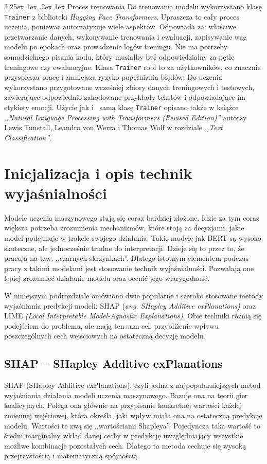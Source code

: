 \documentclass[wmii, inf, mgr]{uwmthesis}
\makeatletter
\renewcommand\paragraph{\@startsection{paragraph}{4}{\z@}%
  {3.25ex \@plus1ex \@minus.2ex}%
  {1ex}%
  {\normalfont\normalsize\bfseries}}
\makeatother
\begin{document}
\paragraph{Proces trenowania}
Do trenowania modelu wykorzystano klasę \texttt{Trainer} z biblioteki \textit{Hugging Face Transformers}. Upraszcza to cały proces uczenia, ponieważ automatyzuje wiele aspektów. Odpowiada za: właściwe przetwarzanie danych, wykonywanie trenowania i ewaluacji, zapisywanie wag modelu po epokach oraz prowadzenie logów treningu. Nie ma potrzeby samodzielnego pisania kodu, który musiałby być odpowiedzialny za pętle treningowe czy ewaluacyjne. Klasa \texttt{Trainer} robi to za użytkowników, co znacznie przyspiesza pracę i zmniejsza ryzyko popełniania błędów. Do uczenia wykorzystano przygotowane wcześniej zbiory danych treningowych i testowych, zawierające odpowiednio zakodowane przykłady tekstów i odpowiadające im etykiety emocji. Użycie jak i~ samą klasę \texttt{Trainer} opisano także w książce \textit{,,Natural Language Processing with Transformers (Revised Edition)''} \cite{NaturalLanguageProcessing} autorzy Lewis Tunstall, Leandro von Werra i Thomas Wolf w rozdziale \textit{,,Text Classification''}.


\section{Inicjalizacja i opis technik wyjaśnialności}
Modele uczenia maszynowego stają się coraz bardziej złożone. Idzie za tym coraz większa potrzeba zrozumienia mechanizmów, które stoją za decyzjami, jakie model podejmuje w trakcie swojego działania. Takie modele jak BERT są wysoko skuteczne, ale jednocześnie trudne do interpretacji. Dzieje się to przez to, że pracują na tzw. ,,czarnych skrzynkach''. Dlatego istotnym elementem podczas pracy z takimi modelami jest stosowanie technik wyjaśnialności. Pozwalają one lepiej zrozumieć działanie modelu oraz ocenić jego wiarygodność.

W niniejszym podrozdziale omówiono dwie popularne i szeroko stosowane metody wyjaśniania predykcji modeli: SHAP (\textit{ang. SHapley Additive exPlanations)} oraz LIME \textit{(Local Interpretable Model-Agnostic Explanations)}. Obie techniki różnią się podejściem do problemu, ale mają ten sam cel, przybliżenie wpływu poszczególnych cech wejściowych na ostateczną decyzję modelu.

\subsection{SHAP -- SHapley Additive exPlanations}
SHAP (SHapley Additive exPlanations), czyli jedna z najpopularniejszych metod wyjaśniania działania modeli uczenia maszynowego. Bazuje ona na teorii gier koalicyjnych. Polega ona głównie na przypisanie konkretnej wartości każdej zmiennej wejściowej, która określa, jaki wpływ miała ona na ostateczną predykcję modelu. Wartości te zwą się ,,wartościami Shapleya''. Pojedyncza taka wartość to średni marginalny wkład danej cechy w predykcję uwzględniający wszystkie możliwe kombinacje pozostałych cech. Dlatego ta metoda cechuje się wysoką przejrzystością i matematyczną spójnością.
\end{document}
